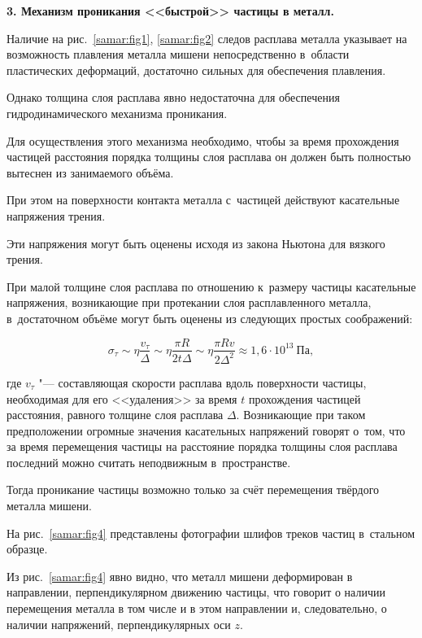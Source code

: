 \smallskip



\textbf{3. Механизм проникания  <<быстрой>> частицы в металл.}

Наличие на рис.~\ref{samar:fig1}, \ref{samar:fig2} следов расплава металла  указывает на возможность плавления металла мишени непосредственно в~области пластических деформаций,  достаточно сильных для обеспечения плавления. 

Однако толщина слоя расплава явно недостаточна для обеспечения гидродинамического механизма проникания.

Для осуществления этого механизма необходимо, чтобы за время прохождения частицей расстояния порядка толщины слоя расплава он должен быть полностью вытеснен из занимаемого объёма. 

При этом на поверхности контакта металла с~частицей действуют касательные напряжения трения. 

Эти напряжения могут быть оценены исходя из закона Ньютона для вязкого трения. 

При малой толщине слоя расплава  по отношению к~размеру частицы  касательные напряжения, возникающие при протекании слоя расплавленного металла, в~достаточном объёме могут быть оценены из следующих простых соображений:

\begin{equation*}

\sigma_{\tau}\sim\eta\frac{v_{\tau}}{\Delta}\sim\eta\frac{\pi R}{2t\Delta}\sim\eta\frac{\pi Rv}{2\Delta^{2}}\approx 1,6\cdot10^{13}~\mbox{Па},

\end{equation*}

где $v_{\tau} $ "--- составляющая скорости расплава вдоль поверхности частицы, необходимая для его <<удаления>> за время $t$ прохождения частицей расстояния, равного толщине слоя расплава $\Delta $. Возникающие при таком предположении огромные значения касательных напряжений говорят о~том, что за время перемещения частицы на расстояние порядка толщины слоя расплава последний можно считать неподвижным в~пространстве. 

Тогда проникание частицы возможно только за счёт перемещения твёрдого металла мишени. 

На рис.~\ref{samar:fig4}  представлены фотографии шлифов треков частиц  в~стальном образце.



Из рис.~\ref{samar:fig4}   явно видно, что металл мишени деформирован в направлении, перпендикулярном движению частицы, что говорит о наличии перемещения металла в том числе и в этом направлении и, следовательно, о наличии напряжений, перпендикулярных оси $z $. 

